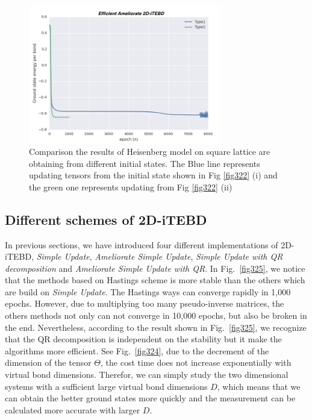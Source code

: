 \begin{figure}[ht]
	\centering
	\includegraphics[width=0.75\textwidth]{figures/fig323.png}
	\caption[Comparison the results of Heisenberg model on square lattice which are obtaining from different initial states.]{Comparison the results of Heisenberg model on square lattice are obtaining from different initial states. The Blue line represents updating tensors from the initial state shown in Fig \ref{fig322} (i) and the green one represents updating from Fig \ref{fig322} (ii)}

	\label{fig323}
\end{figure}

\subsection{Different schemes of 2D-iTEBD}

In previous sections, we have introduced four different implementations of 2D-iTEBD, \textit{Simple Update}, \textit{Ameliorate Simple Update}, \textit{Simple Update with QR decomposition} and \textit{Ameliorate Simple Update with QR}. In Fig.~\ref{fig325}, we notice that the methods based on Hastings scheme is more stable than the others which are build on \textit{Simple Update}. The Hastings ways can converge rapidly in 1,000 epochs. However, due to multiplying too many pseudo-inverse matrices, the others methods not only can not converge in 10,000 epochs, but also be broken in the end. Nevertheless, according to the result shown in Fig.~\ref{fig325}, we recognize that the QR decomposition is independent on the stability but it make the algorithms more efficient. See Fig.~\ref{fig324}, due to the decrement of the dimension of the tensor $\Theta$, the cost time does not increase exponentially with virtual bond dimensions. Therefor, we can simply study the two dimensional systems with a sufficient large virtual bond dimensions $D$, which means that we can obtain the better ground states more quickly and the measurement can be calculated more accurate with larger $D$.

